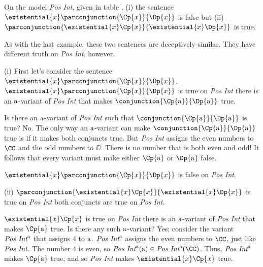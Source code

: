 \begin{majorILnc}{}
	On the model \emph{Pos Int}, given in table , (i) the sentence $\existential{\variable{x}}\parconjunction{\Cp{\variable{x}}}{\Dp{\variable{x}}}$ is false but (ii) $\parconjunction{\existential{\variable{x}}\Cp{\variable{x}}}{\existential{\variable{x}}\Dp{\variable{x}}}$ is true.
\end{majorILnc}
\begin{PROOF}
	As with the last example, these two sentences are deceptively similar.  They have different truth on \emph{Pos Int}, however.
	
(i) First let's consider the sentence $\existential{\variable{x}}\parconjunction{\Cp{\variable{x}}}{\Dp{\variable{x}}}$.  $\existential{\variable{x}}\parconjunction{\Cp{\variable{x}}}{\Dp{\variable{x}}}$ is true on \emph{Pos Int} \Iff there is an $\mathrm{a}$-variant of \emph{Pos Int} that makes $\conjunction{\Cp{\constant{a}}}{\Dp{\constant{a}}}$ true.  

Is there an $\mathrm{a}$-variant of $\emph{Pos Int}$ such that $\conjunction{\Cp{\constant{a}}}{\Dp{\constant{a}}}$ is true?  No.  The only way an $\mathrm{a}$-variant can make $\conjunction{\Cp{\constant{a}}}{\Dp{\constant{a}}}$ true is if it makes both conjuncts true.  But \emph{Pos Int} assigns the even numbers to $\CC$ and the odd numbers to $\DD$.  There is no number that is both even and odd!  It follows that every variant must make either $\Cp{\constant{a}}$ or $\Dp{\constant{a}}$ false.

$\existential{\variable{x}}\parconjunction{\Cp{\variable{x}}}{\Dp{\variable{x}}}$ is false on \emph{Pos Int}.

(ii) $\parconjunction{\existential{\variable{x}}\Cp{\variable{x}}}{\existential{\variable{x}}\Dp{\variable{x}}}$ is true on \emph{Pos Int} \Iff both conjuncts are true on \emph{Pos Int}.

$\existential{\variable{x}}\Cp{\variable{x}}$ is true on \emph{Pos Int} \Iff there is an $\mathrm{a}$-variant of \emph{Pos Int} that makes $\Cp{\constant{a}}$ true.  Is there any such $\mathrm{a}$-variant?  Yes; consider the variant $\emph{Pos Int}^{\mathrm{a}}$ that assigns $4$ to $\mathrm{a}$.  $\emph{Pos Int}^{\mathrm{a}}$ assigns the even numbers to $\CC$, just like $\emph{Pos Int}$.  The number $4$ is even, so $\emph{Pos Int}^{\constant{a}}(\constant{a})\in\emph{Pos Int}^{\constant{a}}(\CC)$.  Thus, $\emph{Pos Int}^{\mathrm{a}}$ makes $\Cp{\constant{a}}$ true, and so \emph{Pos Int} makes $\existential{\variable{x}}\Cp{\variable{x}}$ true.


\end{PROOF}
